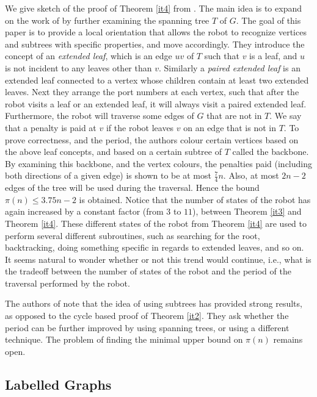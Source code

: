 \documentclass[12pt,letterpaper,oneside]{book}
\begin{document}
We give sketch of the proof of Theorem \ref{it4} from \cite{GKMNZ}.  The main idea 
is to expand on the work of \cite{I} by further examining the spanning tree $T$ of $G$.  The goal of this 
paper is to provide a local orientation that allows the robot to recognize vertices and subtrees with specific properties, and move accordingly.  
They introduce the concept of an \emph{extended leaf}, which is an edge $uv$ of $T$ such that $v$ is a leaf, and $u$ is not incident to any 
leaves other than $v$.  Similarly a \emph{paired extended leaf} 
is an extended leaf connected to a vertex whose children contain at least two extended leaves.  Next they arrange the port numbers at each vertex, 
such that after the robot visits a leaf or an extended leaf, it will always visit a paired extended leaf.  Furthermore, the robot will 
traverse some edges of $G$ that are not in $T$.  We say that a penalty is paid at $v$ if the robot leaves $v$ on an edge that is 
not in $T$.  To prove correctness, and the period, 
the authors 
colour certain vertices based on the above leaf concepts, and based on a certain subtree of $T$ called the backbone.  By examining this backbone, 
and the 
vertex colours, the penalties paid (including both directions of a given edge) is shown to be at most $\frac{7}{4}n$.  Also, 
at most $2n-2$ edges of the tree will be used during the traversal.  Hence the bound $\pi(n)\le 3.75n-2$ is obtained.  Notice that 
the number of states of the robot has again increased by a constant factor (from $3$ to $11$), between Theorem \ref{it3} and 
Theorem \ref{it4}.  These different 
states of the robot from Theorem \ref{it4} are used to perform several different subroutines, such as searching for the root, backtracking, 
doing something specific in regards to extended leaves, and so on.  It seems natural to wonder whether or not this trend would continue, i.e., 
what is the tradeoff between the number of states of the robot and the period of the traversal performed by the robot.  

The authors of \cite{GKMNZ} note that the idea 
of using subtrees has provided strong results, as opposed to the cycle based proof of Theorem \ref{it2}.  They ask whether the 
period can be further improved by using spanning 
trees, or using a different technique.  The problem of finding the minimal upper bound on $\pi(n)$ remains open.   



\subsection{Labelled Graphs}\label{seclab}
 
\end{document}

